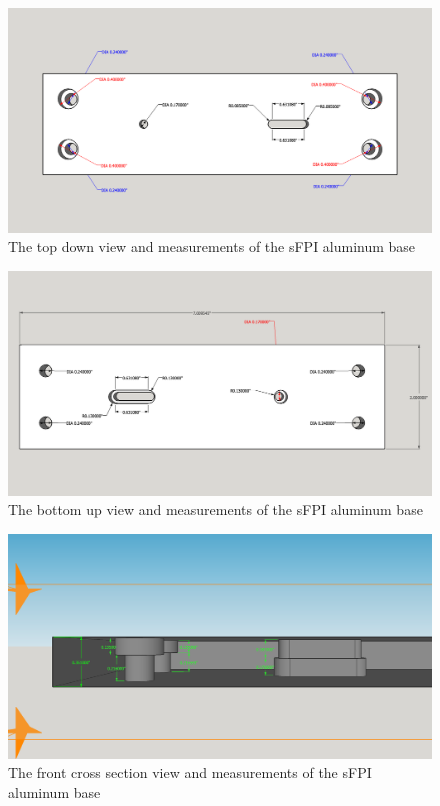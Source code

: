 \documentclass[12pt,journal]{IEEEtran}
\begin{document}
\begin{appendices}
\begin{figure}[h!]
  \centering
	\includegraphics[width=\textwidth]{./mechanical/sfpilensholder_top.png}
	\caption[Cavity Mounts]{The top down view and measurements of the sFPI aluminum base}
	\label{fig:sfpilensholder-top}
\end{figure}  

\begin{figure}[h!]
  \centering
	\includegraphics[width=\textwidth]{./mechanical/sfpilensholder_bottom.png}
	\caption[Cavity Mounts]{The bottom up view and measurements of the sFPI aluminum base}
	\label{fig:sfpilensholder-bottom}
\end{figure}  

\begin{figure}[h!]
  \centering
	\includegraphics[width=\textwidth]{./mechanical/sfpilensholder_cross_section_1.png}
	\caption[Cavity Mounts]{The front cross section view and measurements of the sFPI aluminum base}
	\label{fig:sfpilensholder-side}
\end{figure} 


\end{appendices}
\end{document}
